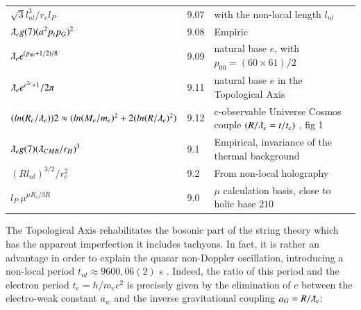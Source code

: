 \documentclass[a4paper,9pt]{article}
\begin{document}
\begin{table}
\begin{tabular}{lll}
    
    
  
  $ \sqrt 3l_{nl}^3/r_el_P $ & 9.07 & with the non-local length $l_{nl}$  \\
  
  $ \lambdabar_e g(7) (a^2p_tp_G)^2 $ & 9.08 & Empiric \cite{Sanchez2}  \\
  
  $ \lambdabar_e e^{(p_{00}+1/2)/8} $ & 9.09 & natural base $e$, with $p_{00} = (60 \times 61)/2$ \\
  
  
  
  $ \lambdabar_e e^{e^{2e}+1}/2\pi $ & 9.11 & natural base $e$ in the Topological Axis\\
  
 $ (ln(R_c/\lambdabar_e)) 2 \approx (ln(M_e/m_e)^2 + 2(ln(R/\lambdabar_e)^2) $ & 9.12 & c-observable Universe  Cosmos couple $(R/\lambdabar_e = t/t_e)$ , fig 1   \\
 
  
  
  
  
  
 $ \lambdabar_e g(7) (\lambdabar_{CMB}/r_H)^3 $ & 9.1 & Empirical, invariance of the thermal background \cite{Sanchez2}  \\
 
 $  (Rl_{nl})^{3/2}/r_e^2 $ & 9.2 & From non-local holography \cite{Sanchez2}  \\
 
  $  l_P ~ \mu^{\mu R_e/3R}  $ & 9.0 & $\mu$ calculation basis, close to holic base $210$   \\
  
  
  
  
 
 \bottomrule
  \end{tabular}
\end{table} 
  
    
     

The Topological Axis rehabilitates the bosonic part of the string theory which has the apparent imperfection it includes tachyons. In fact, it is rather an advantage in order to explain the quasar non-Doppler oscillation, introducing a non-local period $t_{nl} \approx 9600,06 (2) $ s \cite{Kotov}. Indeed, the ratio of this period and the electron period $t_e = h/m_ec^2$ is precisely given by the elimination of $c$ between the electro-weak constant $a_w$ and the inverse gravitational coupling $a_G = R/\lambdabar_e $:
\end{document}
